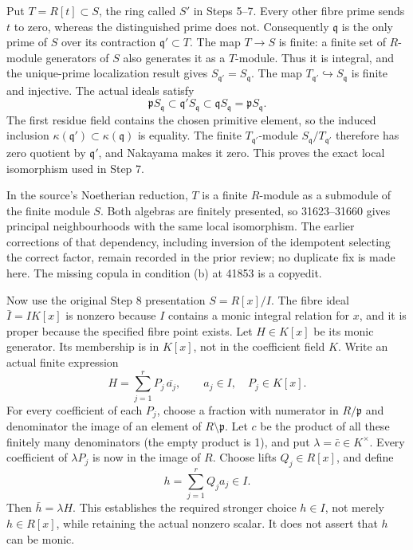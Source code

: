 Put \(T=R[t]\subset S\), the ring called \(S'\) in Steps 5--7. Every other fibre prime sends \(t\) to zero, whereas the distinguished prime does not. Consequently \(\mathfrak q\) is the only prime of \(S\) over its contraction \(\mathfrak q'\subset T\). The map \(T\to S\) is finite: a finite set of \(R\)-module generators of \(S\) also generates it as a \(T\)-module. Thus it is integral, and the unique-prime localization result gives \(S_{\mathfrak q'}=S_{\mathfrak q}\). The map \(T_{\mathfrak q'}\hookrightarrow S_{\mathfrak q}\) is finite and injective. The actual ideals satisfy \[
\mathfrak pS_{\mathfrak q}
\subset\mathfrak q'S_{\mathfrak q}
\subset\mathfrak qS_{\mathfrak q}
=\mathfrak pS_{\mathfrak q}.
\] The first residue field contains the chosen primitive element, so the induced inclusion \(\kappa(\mathfrak q')\subset\kappa(\mathfrak q)\) is equality. The finite \(T_{\mathfrak q'}\)-module \(S_{\mathfrak q}/T_{\mathfrak q'}\) therefore has zero quotient by \(\mathfrak q'\), and Nakayama makes it zero. This proves the exact local isomorphism used in Step 7.

In the source's Noetherian reduction, \(T\) is a finite \(R\)-module as a submodule of the finite module \(S\). Both algebras are finitely presented, so 31623--31660 gives principal neighbourhoods with the same local isomorphism. The earlier corrections of that dependency, including inversion of the idempotent selecting the correct factor, remain recorded in the prior review; no duplicate fix is made here. The missing copula in condition (b) at 41853 is a copyedit.

Now use the original Step 8 presentation \(S=R[x]/I\). The fibre ideal \(\bar I=I K[x]\) is nonzero because \(I\) contains a monic integral relation for \(x\), and it is proper because the specified fibre point exists. Let \(H\in K[x]\) be its monic generator. Its membership is in \(K[x]\), not in the coefficient field \(K\). Write an actual finite expression \[
H=\sum_{j=1}^r P_j\,\overline{a_j},
\qquad a_j\in I,\quad P_j\in K[x].
\] For every coefficient of each \(P_j\), choose a fraction with numerator in \(R/\mathfrak p\) and denominator the image of an element of \(R\setminus\mathfrak p\). Let \(c\) be the product of all these finitely many denominators (the empty product is 1), and put \(\lambda=\bar c\in K^\times\). Every coefficient of \(\lambda P_j\) is now in the image of \(R\). Choose lifts \(Q_j\in R[x]\), and define \[
h=\sum_{j=1}^r Q_j a_j\in I.
\] Then \(\bar h=\lambda H\). This establishes the required stronger choice \(h\in I\), not merely \(h\in R[x]\), while retaining the actual nonzero scalar. It does not assert that \(h\) can be monic.

